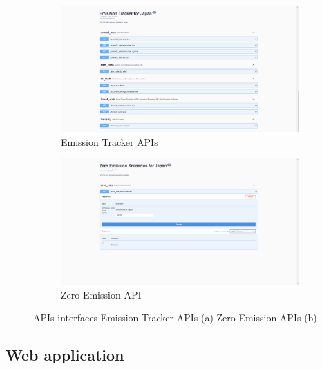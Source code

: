 \begin{figure}[tbh!]
  \centering
  \begin{subfigure}{.5\textwidth}
      \centering
      \includegraphics[width=.9\textwidth]{figs/chap7/api1.png}
      \caption{Emission Tracker APIs}
  \end{subfigure}%
  \begin{subfigure}{.5\textwidth}
      \centering
      \includegraphics[width=.9\textwidth]{figs/chap7/api2.png}
      \caption{Zero Emission API}
  \end{subfigure}
  \caption{APIs interfaces Emission Tracker APIs (a) Zero Emission APIs (b)}
  \label{fig:chap7_fig_api}
\end{figure}


\subsection{Web application}

